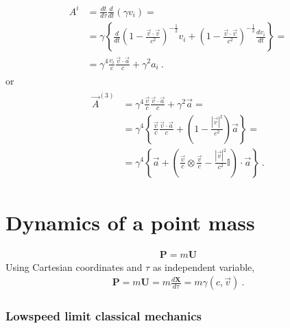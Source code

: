 \documentclass[letterpaper,10pt,english]{jupyterBook}
\begin{document}
\begin{equation*}
\begin{split}\begin{aligned}
  A^i 
  & = \frac{d t}{d \tau} \frac{d}{dt} \left( \gamma v_i \right) = \\
  & = \gamma \left\{ \frac{d}{dt} \left( 1 - \frac{\vec{v} \cdot \vec{v}}{c^2} \right)^{-\frac{1}{2}} v_i + \left( 1 - \frac{\vec{v} \cdot \vec{v}}{c^2} \right)^{-\frac{1}{2}} \frac{d v_i}{dt} \right\} = \\
  & = \gamma^4  \frac{v_i}{c}\frac{\vec{v} \cdot \vec{a}}{c} + \gamma^2 a_i \ .
\end{aligned}\end{split}
\end{equation*}
\sphinxAtStartPar
or
\begin{equation*}
\begin{split}\begin{aligned}
  \vec{A}^{(3)}
  & = \gamma^4  \frac{\vec{v}}{c} \frac{\vec{v} \cdot \vec{a}}{c} + \gamma^2 \vec{a} = \\
  & = \gamma^4 \left\{ \frac{\vec{v}}{c} \frac{\vec{v}\cdot\vec{a}}{c} + \left( 1 - \frac{|\vec{v}|^2}{c^2} \right) \vec{a} \right\} = \\
  & = \gamma^4 \left\{ \vec{a} + \left( \frac{\vec{v}}{c} \otimes \frac{\vec{v}}{c} - \frac{| \vec{v} |^2}{c^2} \mathbb{I} \right) \cdot \vec{a} \right\} \ . 
\end{aligned}\end{split}
\end{equation*}

\section{Dynamics of a point mass}
\label{\detokenize{ch/relativity-special/notes:dynamics-of-a-point-mass}}
\sphinxAtStartPar
{}
\begin{equation*}
\begin{split}\mathbf{P} = m \mathbf{U}\end{split}
\end{equation*}
\sphinxAtStartPar
Using Cartesian coordinates and \(\tau\) as independent variable,
\begin{equation*}
\begin{split}\mathbf{P} = m \mathbf{U} = m \frac{d \mathbf{X}}{d \tau} = m \gamma (c, \vec{v}) \ .\end{split}
\end{equation*}\subsubsection*{Low\sphinxhyphen{}speed limit \sphinxhyphen{} classical mechanics}
\end{document}
